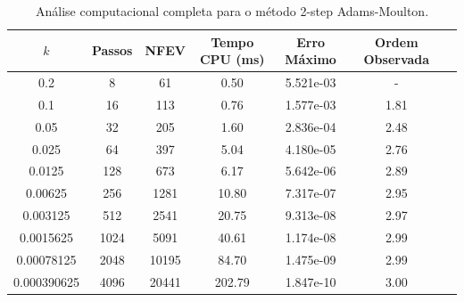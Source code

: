 \begin{table}[H]
    \centering
    \begin{tabular}{ccccccc}
        \hline
        $k$ & Passos & NFEV & Tempo CPU (ms) & Erro Máximo & Ordem Observada \\
        \hline
        0.2 & 8 & 61 & 0.50  & 5.521e-03 & - \\
        0.1 & 16 & 113 & 0.76  & 1.577e-03 & 1.81 \\
        0.05 & 32 & 205 & 1.60  & 2.836e-04 & 2.48 \\
        0.025 & 64 & 397 & 5.04  & 4.180e-05 & 2.76 \\
        0.0125 & 128 & 673 & 6.17  & 5.642e-06 & 2.89 \\
        0.00625 & 256 & 1281 & 10.80  & 7.317e-07 & 2.95 \\
        0.003125 & 512 & 2541 & 20.75  & 9.313e-08 & 2.97 \\
        0.0015625 & 1024 & 5091 & 40.61  & 1.174e-08 & 2.99 \\
        0.00078125 & 2048 & 10195 & 84.70  & 1.475e-09 & 2.99 \\
        0.000390625 & 4096 & 20441 & 202.79  & 1.847e-10 & 3.00 \\
        \hline
    \end{tabular}
    \caption{Análise computacional completa para o método 2-step Adams-Moulton.}
    \label{tab:erros_2-step_adams-moulton}
\end{table}
